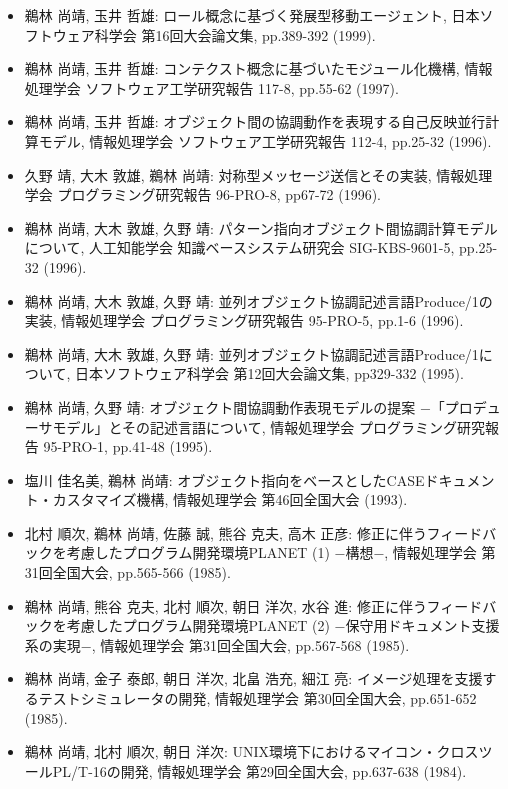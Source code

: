 \documentclass{jarticle}
\begin{document}
\begin{itemize}
\item 鵜林 尚靖, 玉井 哲雄:
ロール概念に基づく発展型移動エージェント,
日本ソフトウェア科学会 第16回大会論文集,
pp.389-392 (1999).

\item 鵜林 尚靖, 玉井 哲雄:
コンテクスト概念に基づいたモジュール化機構,
情報処理学会 ソフトウェア工学研究報告 117-8,
pp.55-62 (1997).

\item 鵜林 尚靖, 玉井 哲雄:
オブジェクト間の協調動作を表現する自己反映並行計算モデル,
情報処理学会 ソフトウェア工学研究報告 112-4,
pp.25-32 (1996).

\item 久野 靖, 大木 敦雄, 鵜林 尚靖:
対称型メッセージ送信とその実装,
情報処理学会 プログラミング研究報告 96-PRO-8,
pp67-72 (1996).

\item 鵜林 尚靖, 大木 敦雄, 久野 靖:
パターン指向オブジェクト間協調計算モデルについて,
人工知能学会 知識ベースシステム研究会 SIG-KBS-9601-5,
pp.25-32 (1996).

\item 鵜林 尚靖, 大木 敦雄, 久野 靖:
並列オブジェクト協調記述言語Produce/1の実装,
情報処理学会 プログラミング研究報告 95-PRO-5,
pp.1-6 (1996).

\item 鵜林 尚靖, 大木 敦雄, 久野 靖:
並列オブジェクト協調記述言語Produce/1について,
日本ソフトウェア科学会 第12回大会論文集,
pp329-332 (1995).

\item 鵜林 尚靖, 久野 靖:
オブジェクト間協調動作表現モデルの提案
    −「プロデューサモデル」とその記述言語について,
情報処理学会 プログラミング研究報告 95-PRO-1,
pp.41-48 (1995).

\item 塩川 佳名美, 鵜林 尚靖:
オブジェクト指向をベースとしたCASEドキュメント・カスタマイズ機構,
情報処理学会 第46回全国大会
(1993).

\item 北村 順次, 鵜林 尚靖, 佐藤 誠, 熊谷 克夫, 高木 正彦:
修正に伴うフィードバックを考慮したプログラム開発環境PLANET (1) −構想−,
情報処理学会 第31回全国大会,
pp.565-566 (1985).

\item 鵜林 尚靖, 熊谷 克夫, 北村 順次, 朝日 洋次, 水谷 進:
修正に伴うフィードバックを考慮したプログラム開発環境PLANET (2) −保守用ドキュメント支援系の実現−,
情報処理学会 第31回全国大会,
pp.567-568 (1985).

\item 鵜林 尚靖, 金子 泰郎, 朝日 洋次, 北畠 浩充, 細江 亮:
イメージ処理を支援するテストシミュレータの開発,
情報処理学会 第30回全国大会,
pp.651-652 (1985).

\item 鵜林 尚靖, 北村 順次, 朝日 洋次:
UNIX環境下におけるマイコン・クロスツールPL/T-16の開発,
情報処理学会 第29回全国大会,
pp.637-638 (1984).
\end{itemize}
\end{document}

